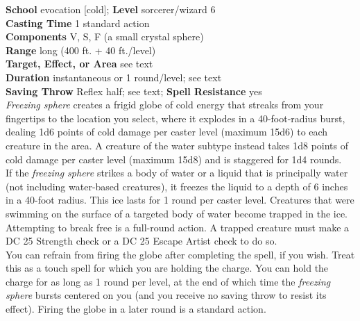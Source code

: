 \textbf{School} evocation [cold]; \textbf{Level} sorcerer/wizard 6\\
\textbf{Casting Time} 1 standard action\\
\textbf{Components} V, S, F (a small crystal sphere)\\
\textbf{Range} long (400 ft. + 40 ft./level)\\
\textbf{Target, Effect, or Area} see text\\
\textbf{Duration} instantaneous or 1 round/level; see text\\
\textbf{Saving Throw} Reflex half; see text; \textbf{Spell Resistance} yes\\
\textit{Freezing sphere }creates a frigid globe of cold energy that streaks from your fingertips to the location you select, where it explodes in a 40-foot-radius burst, dealing 1d6 points of cold damage per caster level (maximum 15d6) to each creature in the area. A creature of the water subtype instead takes 1d8 points of cold damage per caster level (maximum 15d8) and is staggered for 1d4 rounds.\\
If the \textit{freezing sphere }strikes a body of water or a liquid that is principally water (not including water-based creatures), it freezes the liquid to a depth of 6 inches in a 40-foot radius. This ice lasts for 1 round per caster level. Creatures that were swimming on the surface of a targeted body of water become trapped in the ice. Attempting to break free is a full-round action. A trapped creature must make a DC 25 Strength check or a DC 25 Escape Artist check to do so.\\
You can refrain from firing the globe after completing the spell, if you wish. Treat this as a touch spell for which you are holding the charge. You can hold the charge for as long as 1 round per level, at the end of which time the \textit{freezing sphere }bursts centered on you (and you receive no saving throw to resist its effect). Firing the globe in a later round is a standard action.\\
